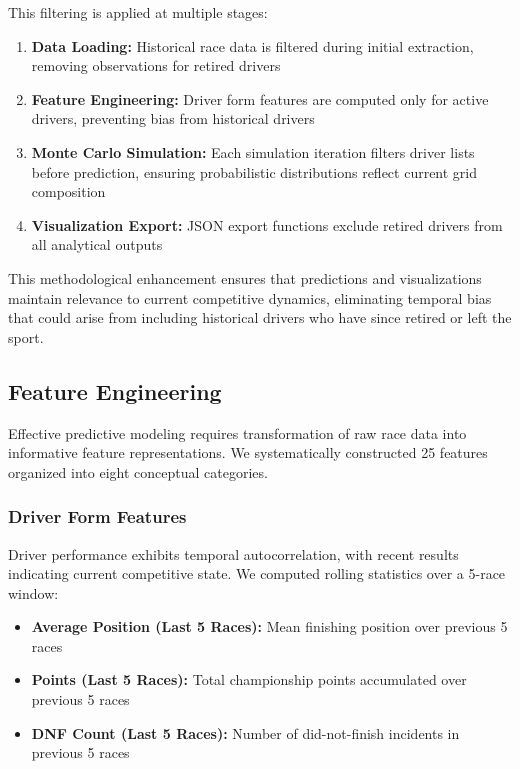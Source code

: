 \documentclass[conference]{IEEEtran}
\begin{document}
This filtering is applied at multiple stages:
\begin{enumerate}
    \item \textbf{Data Loading:} Historical race data is filtered during initial extraction, removing observations for retired drivers
    \item \textbf{Feature Engineering:} Driver form features are computed only for active drivers, preventing bias from historical drivers
    \item \textbf{Monte Carlo Simulation:} Each simulation iteration filters driver lists before prediction, ensuring probabilistic distributions reflect current grid composition
    \item \textbf{Visualization Export:} JSON export functions exclude retired drivers from all analytical outputs
\end{enumerate}

This methodological enhancement ensures that predictions and visualizations maintain relevance to current competitive dynamics, eliminating temporal bias that could arise from including historical drivers who have since retired or left the sport.

\subsection{Feature Engineering}

Effective predictive modeling requires transformation of raw race data into informative feature representations. We systematically constructed 25 features organized into eight conceptual categories.

\subsubsection{Driver Form Features}

Driver performance exhibits temporal autocorrelation, with recent results indicating current competitive state. We computed rolling statistics over a 5-race window:

\begin{itemize}
    \item \textbf{Average Position (Last 5 Races):} Mean finishing position over previous 5 races
    \item \textbf{Points (Last 5 Races):} Total championship points accumulated over previous 5 races
    \item \textbf{DNF Count (Last 5 Races):} Number of did-not-finish incidents in previous 5 races
\end{itemize}
\end{document}
